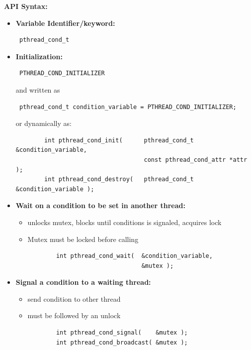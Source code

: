 \documentclass[12pt, a4paper]{report}
\begin{document}
{\bfseries{API Syntax:}}
\begin{itemize}
\item {\bfseries{Variable Identifier/keyword:}} \begin{verbatim} pthread_cond_t \end{verbatim} 
\item {\bfseries{Initialization:}}  \begin{verbatim} PTHREAD_COND_INITIALIZER \end{verbatim}
      and written as \begin{verbatim} pthread_cond_t condition_variable = PTHREAD_COND_INITIALIZER; \end{verbatim}
      or dynamically as: 
    \begin{verbatim} 
        int pthread_cond_init(      pthread_cond_t &condition_variable,
                                    const pthread_cond_attr *attr );
        int pthread_cond_destroy(   pthread_cond_t &condition_variable );
    \end{verbatim}
\item {\bfseries{Wait on a condition to be set in another thread:}} 
        \begin{itemize}
            \item unlocks mutex, blocks until conditions is signaled, acquires lock
            \item Mutex must be locked before calling
    \begin{verbatim}
        int pthread_cond_wait(  &condition_variable,
                                &mutex );
    \end{verbatim}
        \end{itemize}
\item {\bfseries{Signal a condition to a waiting thread:}} 
        \begin{itemize}
            \item send condition to other thread
            \item must be followed by an unlock
    \begin{verbatim}
        int pthread_cond_signal(    &mutex );
        int pthread_cond_broadcast( &mutex );
    \end{verbatim}
        \end{itemize}
\end{itemize}
\end{document}
